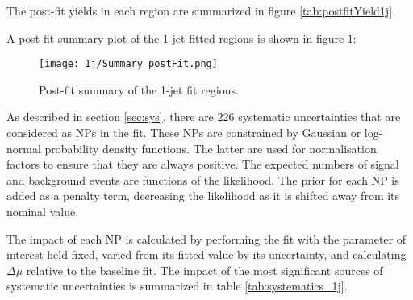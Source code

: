 
The post-fit yields in each region are summarized in figure \ref{tab:postfitYield1j}.

\hspace{-1in}\begin{table}[H]
\begin{adjustwidth}{-3em}{-3em}

\label{tab:postfitYield1j}
\caption{Post-fit yields in each of the 1-jet fit regions.}                                                                 
\end{adjustwidth} 
\end{table}

A post-fit summary plot of the 1-jet fitted regions is shown in figure \ref{fig:fit_results_1j}: 

\begin{figure}[H]
    \center
    \texttt{[image: 1j/Summary\_postFit.png]}
    \caption{Post-fit summary of the 1-jet fit regions.}
    \label{fig:fit_results_1j}
\end{figure}

As described in section \ref{sec:sys}, there are 226 systematic uncertainties that are considered as NPs in the fit. These NPs are constrained by Gaussian or log-normal probability density functions. The latter are used for normalisation factors to ensure that they are always positive. The expected numbers
of signal and background events are functions of the likelihood. The prior for each NP is added as a penalty term, decreasing the likelihood as it is shifted away from its nominal value. 

The impact of each NP is calculated by performing the fit with the parameter of interest held fixed, varied from its fitted value by its uncertainty, and calculating $\Delta\mu$ relative to the baseline fit.  The impact of the most significant sources of systematic uncertainties is summarized in table \ref{tab:systematics_1j}. 


